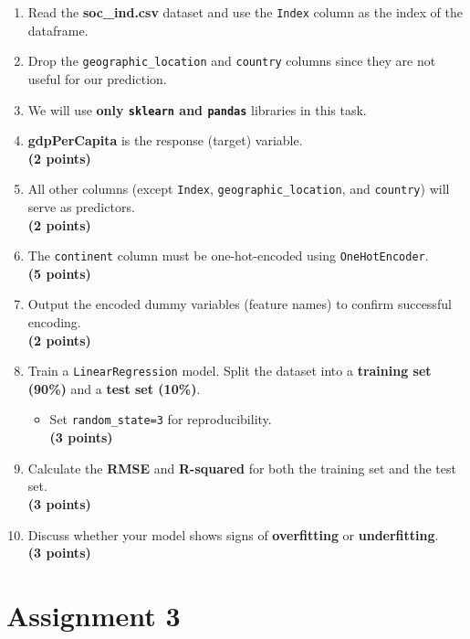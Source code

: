 \documentclass[
  letterpaper,
  DIV=11,
  numbers=noendperiod]{scrreprt}
\providecommand{\tightlist}{%
  \setlength{\itemsep}{0pt}\setlength{\parskip}{0pt}}\usepackage{longtable,booktabs,array}
\begin{document}
\begin{enumerate}
\def\labelenumi{\arabic{enumi}.}
\tightlist
\item
  Read the \textbf{soc\_ind.csv} dataset and use the \texttt{Index}
  column as the index of the dataframe.
\item
  Drop the \texttt{geographic\_location} and \texttt{country} columns
  since they are not useful for our prediction.
\item
  We will use \textbf{only \texttt{sklearn} and \texttt{pandas}}
  libraries in this task.
\item
  \textbf{gdpPerCapita} is the response (target) variable.\\
  \textbf{(2 points)}\\
\item
  All other columns (except \texttt{Index},
  \texttt{geographic\_location}, and \texttt{country}) will serve as
  predictors.\\
  \textbf{(2 points)}\\
\item
  The \texttt{continent} column must be one-hot-encoded using
  \texttt{OneHotEncoder}.\\
  \textbf{(5 points)}
\item
  Output the encoded dummy variables (feature names) to confirm
  successful encoding.\\
  \textbf{(2 points)}\\
\item
  Train a \texttt{LinearRegression} model. Split the dataset into a
  \textbf{training set (90\%)} and a \textbf{test set (10\%)}.

  \begin{itemize}
  \tightlist
  \item
    Set \texttt{random\_state=3} for reproducibility.\\
    \textbf{(3 points)}\\
  \end{itemize}
\item
  Calculate the \textbf{RMSE} and \textbf{R-squared} for both the
  training set and the test set.\\
  \textbf{(3 points)}\\
\item
  Discuss whether your model shows signs of \textbf{overfitting} or
  \textbf{underfitting}.\\
  \textbf{(3 points)}
\end{enumerate}

\chapter{Assignment 3}\label{assignment-3}
\end{document}
